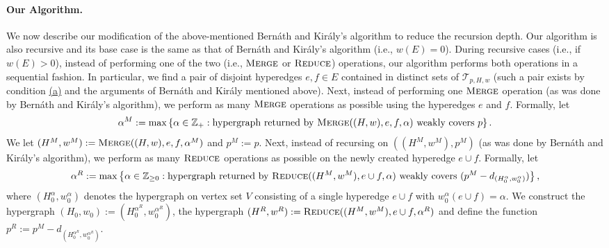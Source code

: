 \documentclass{article}
\newcommand{\maximalTightSetFamily}[1]{\ensuremath{\calT_{#1}}\xspace}
\newcommand{\shubhang}[1]{{\color{blue}[{\tiny Shubhang: \bf #1}]\marginpar{\color{blue}*}}}
\newcommand{\merge}{\ensuremath{\textsc{Merge}}\xspace}
\newcommand{\reduce}{\ensuremath{\textsc{Reduce}}\xspace}
\providecommand{\Z}{\mathbb{Z}}
\providecommand{\calT}{\mathcal{T}}
\begin{document}
\paragraph{Our Algorithm.}
We now describe our modification of the above-mentioned Bern\'{a}th and Kir\'{a}ly's algorithm to reduce the recursion depth. Our algorithm is also recursive and its 
base case is the same as that of Bern\'{a}th and Kir\'{a}ly's algorithm (i.e., $w(E)=0$). During recursive cases (i.e., if $w(E) > 0$), instead of performing one of the two (i.e., \merge or  \reduce) operations, our algorithm performs both operations in a sequential fashion. In particular, we find a pair of disjoint hyperedges $e, f\in E$ contained in distinct sets of $\maximalTightSetFamily{p, H, w}$ (such a pair exists by condition \hyperlink{WeakToStrong(a)}{(a)} and the arguments of Bern\'{a}th and Kir\'{a}ly mentioned above). Next, 
instead of performing one \merge operation (as was done by Bern\'{a}th and Kir\'{a}ly's algorithm), we perform as many  \merge operations as possible %
using the hyperedges $e$ and $f$. 
Formally, let $$\alpha^M := \max\left\{\alpha \in \Z_+ : \text{hypergraph returned by } \merge((H, w), e, f, \alpha) \text{ weakly covers } p\right\}.$$
We let $(H^M, w^M):=\textsc{Merge}((H, w), e, f, \alpha^M)$ and $p^M:=p$.
Next, instead of recursing on $((H^M, w^M), p^M)$ (as was done by Bern\'{a}th and Kir\'{a}ly's algorithm), we perform as many \reduce operations as possible 
on the newly created hyperedge $e\cup f$.
Formally, let $$\alpha^R := \max\left\{\alpha \in \Z_{\ge 0}: \text{hypergraph returned by } \reduce((H^M, w^M), e \cup f, \alpha) \text{ weakly covers } (p^M - d_{(H_0^\alpha, w_0^\alpha)})\right\},$$
where $(H_0^{\alpha}, w_0^{\alpha})$ denotes
the hypergraph on vertex set $V$ consisting of a single hyperedge $e\cup f$ with $w_0^{\alpha}(e\cup f) = \alpha$. 
We construct the hypergraph 
$(H_0, w_0):=(H_0^{\alpha^R}, w_0^{\alpha^R})$, the hypergraph $(H^R, w^R):=\reduce((H^M, w^M), e\cup f, \alpha^R)$ and define the function $p^R:=p^M - d_{(H_0^{\alpha^R}, w_0^{\alpha^R})}$.
\end{document}

